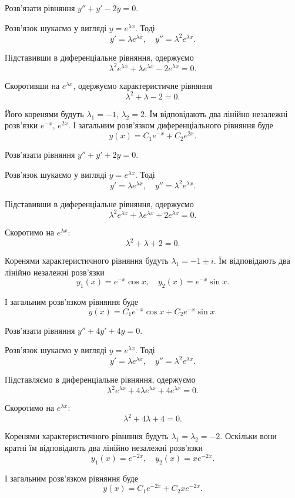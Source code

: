\begin{example}
	Роз\-в'яз\-ати рівняння $y'' + y' - 2 y = 0$.
\end{example}

\begin{solution}
	Роз\-в'яз\-ок шукаємо у вигляді $y = e^{\lambda x}$. Тоді \[y'=\lambda e^{\lambda x}, \quad y''=\lambda^2 e^{\lambda x}.\]
	
	Підставивши в диференціальне рівняння, одержуємо \[ \lambda^2 e^{\lambda x} + \lambda e^{\lambda x} - 2 e^{\lambda x} = 0.\]
	
	Скоротивши на $e^{\lambda x}$, одержуємо характеристичне рівняння \[\lambda^2+\lambda-2=0.\]
	
	Його коренями будуть $\lambda_1=-1$, $\lambda_2=2$. Їм відповідають два лінійно незалежні роз\-в'яз\-ки $e^{-x}$, $e^{2x}$. І загальним роз\-в'яз\-ком диференціального рівняння буде \[ y(x) = C_1 e^{-x} + C_2 e^{2x}.\]
\end{solution}

\begin{example}
	Роз\-в'яз\-а\-ти рівняння $y'' + y' + 2 y = 0$.
\end{example}

\begin{solution}
	Роз\-в'яз\-ок шукаємо у вигляді $y = e^{\lambda x}$. Тоді \[ y' = \lambda e^{\lambda x}, \quad y'' =\lambda^2 e^{\lambda x}.\]
	
	Підставивши в диференціальне рівняння, одержуємо \[ \lambda^2 e^{\lambda x} + \lambda e^{\lambda x} + 2 e^{\lambda x}=0.\]
	
	Скоротимо на $e^{\lambda x}$: \[ \lambda^2+\lambda+2=0.\]
	
	Коренями характеристичного рівняння будуть $\lambda_1=-1\pm i$. Їм відповідають два лінійно незалежні роз\-в'яз\-ки \[y_1(x)=e^{-x} \cos x, \quad y_2(x)=e^{-x} \sin x.\]
	
	І загальним роз\-в'яз\-ком рівняння буде \[y(x)=C_1e^{-x} \cos x+C_2e^{-x} \sin x.\]
\end{solution}

\begin{example}
	Роз\-в'яз\-а\-ти рівняння $y'' + 4 y' + 4 y = 0$.
\end{example}

\begin{solution}
	Роз\-в'яз\-ок шукаємо у вигляді $y = e^{\lambda x}$. Тоді \[y'=\lambda e^{\lambda x},\quad y''=\lambda^2 e^{\lambda x}.\]
	
	Підставляємо в диференціальне рівняння, одержуємо \[\lambda^2 e^{\lambda x}+4\lambda e^{\lambda x}+4e^{\lambda x}=0.\]
	
	Скоротимо на $e^{\lambda x}$:\[\lambda^2+4\lambda+4=0.\]
	
	Коренями характеристичного рівняння будуть $\lambda_1=\lambda_2=-2$. Оскільки вони кратні їм відповідають два лінійно незалежні роз\-в'яз\-ки \[y_1(x)=e^{-2x},\quad y_2(x)=xe^{-2x}.\]
	
	І загальним роз\-в'яз\-ком рівняння буде \[y(x)=C_1e^{-2x}+C_2xe^{-2x}.\]
\end{solution}

